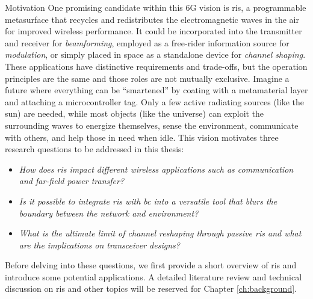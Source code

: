 \begin{section}{Motivation}
	One promising candidate within this 6G vision is \gls{ris}, a programmable metasurface that recycles and redistributes the electromagnetic waves in the air for improved wireless performance.
	It could be incorporated into the transmitter and receiver for \emph{beamforming}, employed as a free-rider information source for \emph{modulation}, or simply placed in space as a standalone device for \emph{channel shaping}.
	These applications have distinctive requirements and trade-offs, but the operation principles are the same and those roles are not mutually exclusive.
	Imagine a future where everything can be ``smartened'' by coating with a metamaterial layer and attaching a microcontroller tag.
	Only a few active radiating sources (like the sun) are needed, while most objects (like the universe) can exploit the surrounding waves to energize themselves, sense the environment, communicate with others, and help those in need when idle.
	This vision motivates three research questions to be addressed in this thesis:
	\begin{itemize}
		\item \emph{How does \gls{ris} impact different wireless applications such as communication and far-field power transfer?}
		\item \emph{Is it possible to integrate \gls{ris} with \gls{bc} into a versatile tool that blurs the boundary between the network and environment?}
		\item \emph{What is the ultimate limit of channel reshaping through passive \gls{ris} and what are the implications on transceiver designs?}
	\end{itemize}

	Before delving into these questions, we first provide a short overview of \gls{ris} and introduce some potential applications.
	A detailed literature review and technical discussion on \gls{ris} and other topics will be reserved for Chapter \ref{ch:background}.
\end{section}

